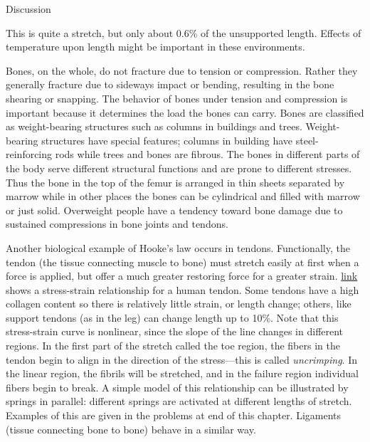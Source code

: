 \documentclass[
]{book}
\begin{document}
{Discussion}

This is quite a stretch, but only about 0.6\% of the unsupported length.
Effects of temperature upon length might be important in these
environments.

Bones, on the whole, do not fracture due to tension or compression.
Rather they generally fracture due to sideways impact or bending,
resulting in the bone shearing or snapping. The behavior of bones under
tension and compression is important because it determines the load the
bones can carry. Bones are classified as weight-bearing structures such
as columns in buildings and trees. Weight-bearing structures have
special features; columns in building have steel-reinforcing rods while
trees and bones are fibrous. The bones in different parts of the body
serve different structural functions and are prone to different
stresses. Thus the bone in the top of the femur is arranged in thin
sheets separated by marrow while in other places the bones can be
cylindrical and filled with marrow or just solid. Overweight people have
a tendency toward bone damage due to sustained compressions in bone
joints and tendons.

Another biological example of Hooke's law occurs in tendons.
Functionally, the tendon (the tissue connecting muscle to bone) must
stretch easily at first when a force is applied, but offer a much
greater restoring force for a greater strain.
\protect\hyperlink{import-auto-id1165296334455}{link} shows a
stress-strain relationship for a human tendon. Some tendons have a high
collagen content so there is relatively little strain, or length change;
others, like support tendons (as in the leg) can change length up to
10\%. Note that this stress-strain curve is nonlinear, since the slope of
the line changes in different regions. In the first part of the stretch
called the toe region, the fibers in the tendon begin to align in the
direction of the stress---this is called \emph{uncrimping}. In the linear
region, the fibrils will be stretched, and in the failure region
individual fibers begin to break. A simple model of this relationship
can be illustrated by springs in parallel: different springs are
activated at different lengths of stretch. Examples of this are given in
the problems at end of this chapter. Ligaments (tissue connecting bone
to bone) behave in a similar way.
\end{document}
